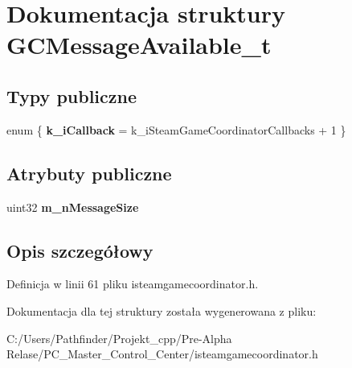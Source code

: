 \hypertarget{struct_g_c_message_available__t}{}\section{Dokumentacja struktury G\+C\+Message\+Available\+\_\+t}
\label{struct_g_c_message_available__t}
\subsection*{Typy publiczne}
\begin{DoxyCompactItemize}
\item 
\mbox{\label{struct_g_c_message_available__t_ac9817110c5d36c715b952144bbe12914}} 
enum \{ {\bfseries k\+\_\+i\+Callback} = k\+\_\+i\+Steam\+Game\+Coordinator\+Callbacks + 1
 \}
\end{DoxyCompactItemize}
\subsection*{Atrybuty publiczne}
\begin{DoxyCompactItemize}
\item 
\mbox{\label{struct_g_c_message_available__t_a37d105524801455b732ae9fbbc660360}} 
uint32 {\bfseries m\+\_\+n\+Message\+Size}
\end{DoxyCompactItemize}


\subsection{Opis szczegółowy}


Definicja w linii 61 pliku isteamgamecoordinator.\+h.



Dokumentacja dla tej struktury została wygenerowana z pliku\+:\begin{DoxyCompactItemize}
\item 
C\+:/\+Users/\+Pathfinder/\+Projekt\+\_\+cpp/\+Pre-\/\+Alpha Relase/\+P\+C\+\_\+\+Master\+\_\+\+Control\+\_\+\+Center/isteamgamecoordinator.\+h\end{DoxyCompactItemize}
